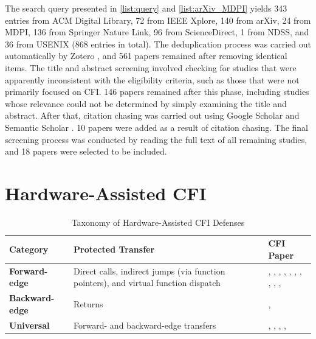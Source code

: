 \documentclass[journal,onecolumn]{IEEEtran}
\begin{document}
The search query presented in \ref{list:query} and \ref{list:arXiv_MDPI} yields 343 entries from ACM Digital Library, 72 from IEEE Xplore, 140 from arXiv, 24 from MDPI, 136 from Springer Nature Link, 96 from ScienceDirect, 1 from NDSS, and 36 from USENIX (868 entries in total). The deduplication process was carried out automatically by Zotero \cite{Zotero}, and 561 papers remained after removing identical items. The title and abstract screening involved checking for studies that were apparently inconsistent with the eligibility criteria, such as those that were not primarily focused on CFI. 146 papers remained after this phase, including studies whose relevance could not be determined by simply examining the title and abstract. After that, citation chasing was carried out using Google Scholar \cite{GoogleScholar} and Semantic Scholar \cite{SemanticScholar}. 10 papers were added as a result of citation chasing. The final screening process was conducted by reading the full text of all remaining studies, and 18 papers were selected to be included.

\section{Hardware-Assisted CFI}\label{sec:body}

\begin{table}[t]
	\centering
	\caption{Taxonomy of Hardware-Assisted CFI Defenses}
	\label{tab:cfi-taxonomy}
	\renewcommand{\arraystretch}{1.35}
	\setlength{\tabcolsep}{4pt}
	\begin{tabular}{
			>{\raggedright\arraybackslash}p{}
			>{\raggedright\arraybackslash}p{}
			>{\raggedright\arraybackslash}p{}
		}
		\toprule
		\textbf{Category} &
		\textbf{Protected Transfer} &
		\textbf{CFI Paper} \\
		\midrule
		\textbf{Forward-edge} &
		Direct calls, indirect jumps (via function pointers), and virtual function dispatch &
		\cite{Demicco25}, \cite{Gaidis23}, \cite{Tan22}, \cite{Ismail24}, \cite{Yue25}, \cite{Kleftogiorgos26}, \cite{Zhao25b}, \cite{Hashemi26}, \cite{She24}, \cite{Unterguggenberger26}, \cite{Kim23} \\[2pt]
		
		\textbf{Backward-edge} &
		Returns &
		\cite{Moreira22}, \cite{Sharma25} \\[2pt]
		
		\textbf{Universal} &
		Forward- and backward-edge transfers &
		\cite{Zhao25}, \cite{Yeoh24}, \cite{Yoo22}, \cite{Zaidenberg26}, \cite{Sun26} \\
		\bottomrule
	\end{tabular}
\end{table}
\end{document}
